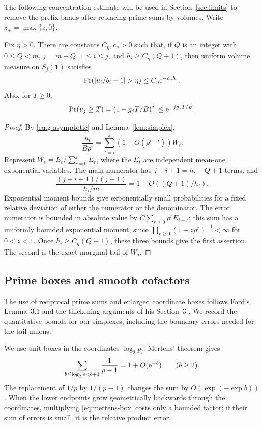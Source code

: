 The following concentration estimate will be used in Section~\ref{sec:limits}
to remove the prefix bands after replacing prime sums by volumes.
Write $z_+=\max\{z,0\}$.

\begin{lemma}\label{lem:concentration}
Fix \(\eta>0\).  There are constants \(C_\eta,c_\eta>0\) such that,
if \(Q\) is an integer with \(0\le Q<m\), \(j=m-Q\),
\(1\le i\le j\), and \(h_i\ge C_\eta(Q+1)\), then
uniform volume measure on \(S_j(\boldsymbol1)\) satisfies
\[
 \Pr(|u_i/b_i-1|>\eta)\le C_\eta\e^{-c_\eta h_i}.
\]
Also, for \(T\ge0\),
\[
 \Pr(u_j\ge T)=(1-g_jT/B)_+^j\le\mathrm e^{-jg_jT/B}.
\]
\end{lemma}

\begin{proof}
By \eqref{eq:g-asymptotic} and Lemma~\ref{lem:simplex},
\[
 \frac{u_i}{B\rho^i}
 =\sum_{t=i}^j(1+O(\rho^{t-i}))W_t.
\]
Represent \(W_t=E_t/\sum_{r=0}^jE_r\), where the \(E_t\) are
independent mean-one exponential variables.  The main numerator has
\(j-i+1=h_i-Q+1\) terms, and
\[
 \frac{(j-i+1)/(j+1)}{h_i/m}
 =1+O((Q+1)/h_i).
\]
Exponential moment bounds give exponentially small probabilities
for a fixed relative deviation of either the numerator or the
denominator.  The error numerator is bounded in absolute value by
\(C\sum_{r\ge0}\rho^rE_{i+r}\); this sum has a uniformly bounded
exponential moment, since
\(\prod_{r\ge0}(1-z\rho^r)^{-1}<\infty\) for \(0<z<1\).
Once \(h_i\ge C_\eta(Q+1)\), these three bounds give the first
assertion.  The second is the exact marginal tail of \(W_j\).
\end{proof}

\subsection{Prime boxes and smooth cofactors}
The use of reciprocal prime sums and enlarged coordinate boxes follows
Ford's Lemma~3.1 and the thickening arguments of his Section~3
\cite{FordTotients2013}. We record the quantitative bounds for our
simplexes, including the boundary errors needed for the tail unions.

We use unit boxes in the coordinates \(\log_2p_i\).
Mertens' theorem gives
\begin{equation}\label{eq:mertens-box}
 \sum_{b\le\log_2p<b+1}\frac1{p-1}=1+O(\mathrm e^{-b})
 \qquad(b\ge2).
\end{equation}
The replacement of \(1/p\) by \(1/(p-1)\) changes the sum by
\(O(\exp(-\exp b))\).  When the lower endpoints grow geometrically
backwards through the coordinates, multiplying
\eqref{eq:mertens-box} costs only a bounded factor; if their sum
of errors is small, it is the relative product error.

